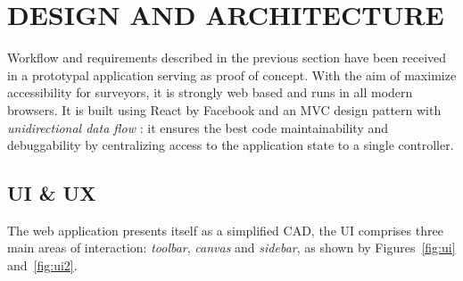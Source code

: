 \vspace{-5mm}
\section{\uppercase{Design and Architecture}}
\label{sec:architecture}

\noindent Workflow and requirements described in the previous section have been received in a prototypal application serving as proof of concept. With the aim of maximize accessibility for surveyors, it is strongly web based and runs in all modern browsers. It is built using React by Facebook and an MVC design pattern with \emph{unidirectional data flow} \cite{redux}:  it ensures the best code maintainability and debuggability by centralizing access to the application state to a single controller.

\vspace{-3mm}\subsection{UI \& UX}\vspace{-3mm}

The web application presents itself as a simplified CAD,  the UI comprises three main areas of interaction: \emph{toolbar}, \emph{canvas} and \emph{sidebar}, as shown by Figures~\ref{fig:ui} and~\ref{fig:ui2}.

